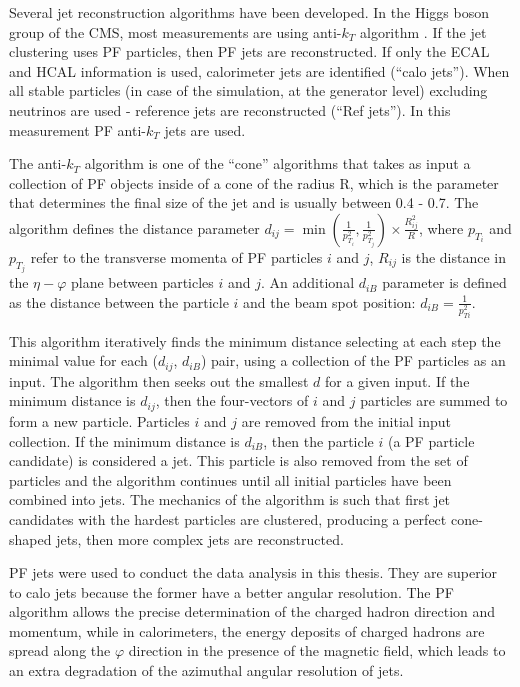 Several jet reconstruction algorithms have been developed. In the Higgs boson group of the CMS, most measurements are using anti-$k_T$ algorithm \cite{antiKt}. If the jet clustering uses PF particles, then PF jets are reconstructed. If only the ECAL and HCAL information is used, calorimeter jets are identified (``calo jets''). When all stable particles (in case of the simulation, at the generator level) excluding neutrinos are used - reference jets are reconstructed (``Ref jets''). In this measurement PF anti-$k_T$ jets are used. 

The anti-$k_T$ algorithm is one of the ``cone'' algorithms that takes as input a collection of PF objects inside of a cone of the radius R, which is the parameter that determines the final size of the jet and is usually between 0.4 - 0.7. The algorithm defines the distance parameter
$d_{ij} = \min (\frac{1}{p^2_{T_i}}, \frac{1}{p^2_{T_j}}) \times \frac{R^2_{ij}}{R}$, where $p_{T_i}$ and $p_{T_j}$ refer to the transverse momenta of PF particles $i$ and $j$, $R_{ij}$ is the distance in the $\eta - \varphi$ plane between particles $i$ and $j$. An additional $d_{iB}$ parameter is defined as the distance between the particle $i$ and the beam spot position: $d_{iB} = \frac{1}{p^2_{Ti} }$.

This algorithm iteratively finds the minimum distance selecting at each step the minimal value for each ($d_{ij}$, $d_{iB}$) pair, using a collection of the PF particles as an input. The algorithm then seeks out the smallest $d$ for a given input. If the minimum distance is $d_{ij}$, then the four-vectors of $i$ and $j$ particles are summed to form a new particle. Particles $i$ and $j$ are removed from the initial input collection. If the minimum distance is $d_{iB}$, then the particle $i$ (a PF particle candidate) is considered a jet. This particle is also removed from the set of particles and the algorithm continues until all initial particles have been combined into jets. The mechanics of the algorithm is such that first jet candidates with the hardest particles are clustered, producing a perfect cone-shaped jets, then more complex jets are reconstructed.

PF jets were used to conduct the data analysis in this thesis. They are superior to calo jets because the former have a better angular resolution. The PF algorithm allows the precise determination of the charged hadron direction and momentum, while in calorimeters, the energy deposits of charged hadrons are spread along the $\varphi$ direction in the presence of the magnetic field, which leads to an extra degradation of the azimuthal angular resolution of jets.

